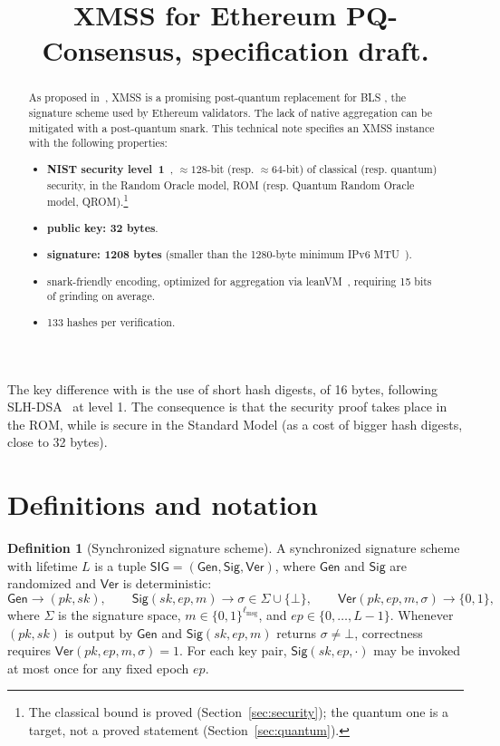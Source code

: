 \documentclass[11pt]{article}
\title{XMSS for Ethereum PQ-Consensus, specification draft.}
\author{}
\date{}
\theoremstyle{definition}
\newtheorem{definition}{Definition}[section]
\theoremstyle{plain}
\theoremstyle{remark}
\newcommand{\bits}[1]{\{0,1\}^{#1}}
\newcommand{\Gen}{\mathsf{Gen}}
\newcommand{\Sig}{\mathsf{Sig}}
\newcommand{\Ver}{\mathsf{Ver}}
\newcommand{\SIG}{\mathsf{SIG}}
\newcommand{\ep}{\mathit{ep}}
\newcommand{\sk}{\mathit{sk}}
\newcommand{\pk}{\mathit{pk}}
\newcommand{\lmsg}{\ell_{\mathrm{msg}}}
\begin{document}
\maketitle

\begin{abstract}
As proposed in~\cite{DKKW25}, XMSS is a promising post-quantum replacement for BLS \cite{BLS}, the signature scheme used by Ethereum validators. The lack of native aggregation can be mitigated with a post-quantum snark. This technical note specifies an XMSS instance with the following properties:
\begin{itemize}
  \item \textbf{NIST security level~1}~\cite{NISTPQC}, $\approx 128$-bit (resp. $\approx 64$-bit) of classical (resp. quantum) security, in the Random Oracle model, ROM (resp. Quantum Random Oracle model, QROM).\footnote{The classical bound is proved (Section~\ref{sec:security}); the quantum one is a target, not a proved statement (Section~\ref{sec:quantum}).}
  \item \textbf{public key: 32 bytes}.
  \item \textbf{signature: 1208 bytes} (smaller than the 1280-byte minimum IPv6 MTU~\cite{RFC8200}).
  \item snark-friendly encoding, optimized for aggregation via leanVM~\cite{leanVM}, requiring 15 bits of grinding on average.
  \item 133 hashes per verification.
\end{itemize}
\end{abstract}

The key difference with \cite{DKKW25} is the use of short hash digests, of 16 bytes, following SLH-DSA~\cite{FIPS205} at level 1. The consequence is that the security proof takes place in the ROM, while \cite{DKKW25} is secure in the Standard Model (as a cost of bigger hash digests, close to 32 bytes).

\section{Definitions and notation}

\begin{definition}[Synchronized signature scheme]
A synchronized signature scheme with lifetime $L$ is a tuple $\SIG=(\Gen,\Sig,\Ver)$, where $\Gen$ and $\Sig$ are randomized and $\Ver$ is deterministic:
\[
  \Gen\longrightarrow(\pk,\sk),\qquad
  \Sig(\sk,\ep,m)\longrightarrow\sigma\in\Sigma\cup\{\bot\},\qquad
  \Ver(\pk,\ep,m,\sigma)\longrightarrow\{0,1\},
\]
where $\Sigma$ is the signature space, $m\in\bits{\lmsg}$, and $\ep\in\{0,\ldots,L-1\}$. Whenever $(\pk,\sk)$ is output by $\Gen$ and $\Sig(\sk,\ep,m)$ returns $\sigma\neq\bot$, correctness requires $\Ver(\pk,\ep,m,\sigma)=1$. For each key pair, $\Sig(\sk,\ep,\cdot)$ may be invoked at most once for any fixed epoch $\ep$.
\end{definition}
\end{document}
